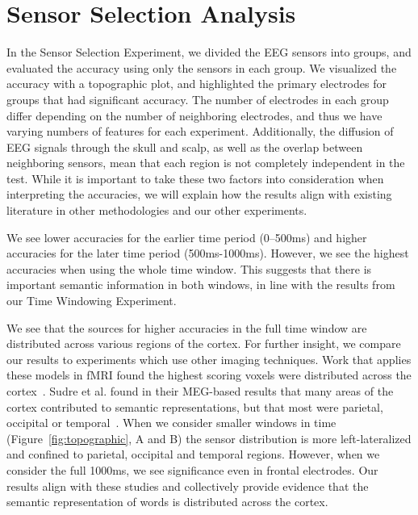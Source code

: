 \section{Sensor Selection Analysis}
In the Sensor Selection Experiment, we divided the EEG sensors into groups, and 
evaluated the \tvt accuracy using only the sensors in each group. We visualized 
the \tvt accuracy with a topographic plot, and highlighted the primary 
electrodes for groups that had significant accuracy. The number of electrodes 
in each group differ depending on the number of neighboring electrodes, and 
thus we have varying numbers of features for each \tvt experiment. 
Additionally, the diffusion of EEG signals through the skull and scalp, as well 
as the overlap between neighboring sensors, mean that each region is not 
completely independent in the \tvt test. While it is important to take these 
two factors into consideration when interpreting the accuracies, we will 
explain how the results align with existing literature in other methodologies 
and our other experiments.

We see lower \tvt accuracies for the earlier time period (0--500ms) and higher 
accuracies for the later time period (500ms-1000ms). However, we see the 
highest accuracies when using the whole time window. This suggests that there 
is important semantic information in both windows, in line with the results 
from our Time Windowing Experiment.

We see that the sources for higher accuracies in the full time window are 
distributed across various regions of the cortex. For further insight, we 
compare our results to experiments which use other imaging techniques. Work 
that applies these models in fMRI found the highest scoring voxels were 
distributed across the cortex~\cite{Mitchell2008, pereira2018toward}. Sudre et 
al. found in their MEG-based results that many areas of the cortex contributed 
to semantic representations, but that most were parietal, occipital or 
temporal~\cite{Sudre2012}. When we consider smaller windows in time 
(Figure~\ref{fig:topographic}, A and B) the sensor distribution is more 
left-lateralized and confined to parietal, occipital and temporal regions.  
However, when we consider the full 1000ms, we see significance even in frontal 
electrodes.  Our results align with these studies and collectively provide 
evidence that the semantic representation of words is distributed across the 
cortex. 
